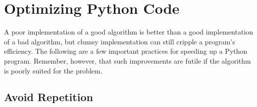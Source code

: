 \section*{Optimizing Python Code} %

A poor implementation of a good algorithm is better than a good implementation of a bad algorithm, but clumsy implementation can still cripple a program's efficiency.
The following are a few important practices for speeding up a Python program.
Remember, however, that such improvements are futile if the algorithm is poorly suited for the problem.

\subsection*{Avoid Repetition} %


